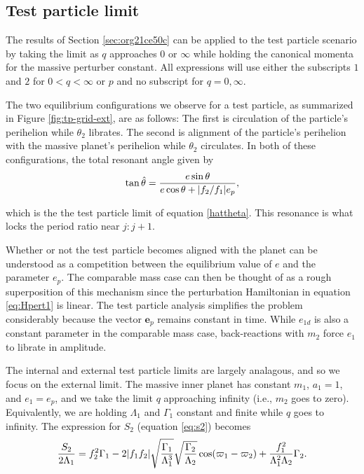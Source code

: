 \documentclass[usenatbib,twocolumn]{mnras}
\DeclarePairedDelimiter{\abs}{|}{|}
\begin{document}
\subsection{Test particle limit}
\label{sec:org6980c11}
The results of Section \ref{sec:org21ce50c} can be applied to the
test particle scenario by taking the limit as \(q\) approaches \(0\) or
\(\infty\) while holding the canonical momenta for the massive perturber
constant.  All expressions will use either the subscripts \(1\)
and \(2\) for \(0<q<\infty\) or \(p\) and no subscript for \(q=0,\infty\).

The two equilibrium configurations we observe for a test particle, as
summarized in Figure \ref{fig:tp-grid-ext}, are as follows: The first is
circulation of the particle's perihelion while \(\theta_2\) librates.
The second is alignment of the particle's perihelion with the massive
planet's perihelion while \(\theta_2\) circulates.  In both of these
configurations, the total resonant angle given by
\begin{align}
  \tan\hat\theta = \frac{e\sin\theta}{e\cos\theta + \abs{f_2/f_1}e_p},
\end{align}

\noindent
which is the the test particle limit of equation \eqref{hattheta}.
This resonance is what locks the period ratio near \(j:j+1\).

Whether or not the test particle becomes aligned with the planet can
be understood as a competition between the equilibrium value of \(e\)
and the parameter \(e_p\). The comparable mass case can then be thought
of as a rough superposition of this mechanism since the perturbation
Hamiltonian in equation \eqref{eq:Hpert1} is linear. The test particle
analysis simplifies the problem considerably because the vector
\(\mathbf{e}_p\) remains constant in time. While \(e_{1d}\) is also a
constant parameter in the comparable mass case, back-reactions with
\(m_2\) force \(e_1\) to librate in amplitude.

The internal and external test particle limits are largely analagous,
and so we focus on the external limit.  The massive inner planet has
constant \(m_1\), \(a_1=1\), and \(e_1=e_p\), and we take the limit \(q\)
approaching infinity (i.e., \(m_2\) goes to zero). Equivalently, we are
holding \(\Lambda_1\) and \(\Gamma_1\) constant and finite while \(q\) goes
to infinity.  The expression for \(S_2\) (equation \eqref{eq:s2}) becomes
\begin{align}
  \label{eq:s2-canon}
  \frac{S_2}{2\Lambda_1} = f_2^2\Gamma_1
  -2\abs{f_1f_2}\sqrt{\frac{\Gamma_1}{\Lambda_1^3}}
  \sqrt{\frac{\Gamma_2}{\Lambda_2}}\cos(\varpi_1-\varpi_2)
  + \frac{f_1^2}{\Lambda_1^2\Lambda_2}\Gamma_2.
\end{align}
\end{document}
